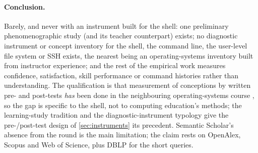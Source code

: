 \paragraph{Conclusion.}
Barely, and never with an instrument built for the shell: one preliminary
phenomenographic study (and its teacher counterpart) exists; no diagnostic
instrument or concept inventory for the shell, the
command line, the user-level file system or SSH exists, the nearest being
an operating-systems inventory built from instructor experience; and the
rest of the empirical work measures confidence, satisfaction, skill
performance or command histories rather than understanding.
The qualification is that measurement of conceptions by written pre- and
post-tests \emph{has} been done in the neighbouring operating-systems
course \autocite{Pamplona2024VirtualMemory}, so the gap is specific to the
shell, not to computing education's methods; the learning-study tradition
\autocite{PangMarton2005,Kullberg2017ZDM} and the diagnostic-instrument
typology \autocite{KaltakciGurel2015Diagnostics} give the pre-/post-test
design of \cref{sec:instruments} its precedent.
Semantic Scholar's absence from the round is the main limitation; the
claim rests on OpenAlex, Scopus and Web of Science, plus DBLP for the
short queries.
